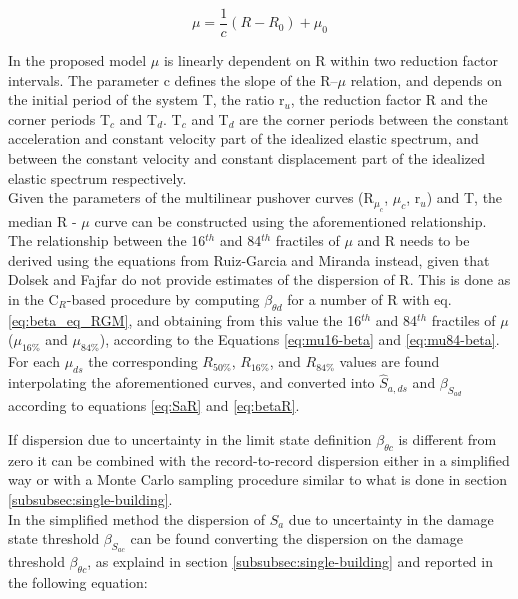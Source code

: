 \begin{equation}
\label{eq:mu_DF}
\mu = \frac{1}{c} (R-R_{0})+\mu_{0}
\end{equation}

In the proposed model $\mu$ is linearly dependent on R within two reduction factor intervals. The parameter c defines the slope of the R–$\mu$ relation, and depends on the initial period of the system T, the ratio r$_{u}$, the reduction factor R and the corner periods T$_{c}$ and T$_{d}$. T$_{c}$ and T$_{d}$ are the corner periods between the constant acceleration and constant velocity part of the idealized elastic spectrum, and between the constant velocity and constant displacement part of the idealized elastic spectrum respectively.\\

Given the parameters of the multilinear pushover curves (R$_{\mu_{c}}$, $\mu_{c}$, r$_{u}$) and T, the median R - $\mu$ curve can be constructed using the aforementioned relationship. 
The relationship between the 16$^{th}$ and 84$^{th}$ fractiles of $\mu$ and R needs to be derived using the equations from Ruiz-Garcia and Miranda instead, given that Dolsek and Fajfar do not provide estimates of the dispersion of R. This is done as in the C$_R$-based procedure by computing $\beta_{\theta d}$ for a number of R with eq. \ref{eq:beta_eq_RGM}, and obtaining from this value the 16$^{th}$ and 84$^{th}$ fractiles of $\mu$ ($\mu_{16\%}$ and $\mu_{84\%}$), according to the Equations \ref{eq:mu16-beta} and \ref{eq:mu84-beta}.\\

For each $\mu_{ds}$ the corresponding $R_{50\%}$, $R_{16\%}$, and $R_{84\%}$ values are found interpolating the aforementioned curves, and converted into $\hat{S}_{a,ds}$ and $\beta_{S_{a d}}$ according to equations \ref{eq:SaR} and \ref{eq:betaR}.

If dispersion due to uncertainty in the limit state definition $\beta_{\theta c}$ is different from zero it can be combined with the record-to-record dispersion either in a simplified way or with a Monte Carlo sampling procedure similar to what is done in section \ref{subsubsec:single-building}.\\

In the simplified method the dispersion of $S_a$ due to uncertainty in the damage state threshold $\beta_{S_{a c}}$  can be found converting the dispersion on the damage threshold $\beta_{\theta c}$, as explaind in section \ref{subsubsec:single-building} and reported in the following equation:

